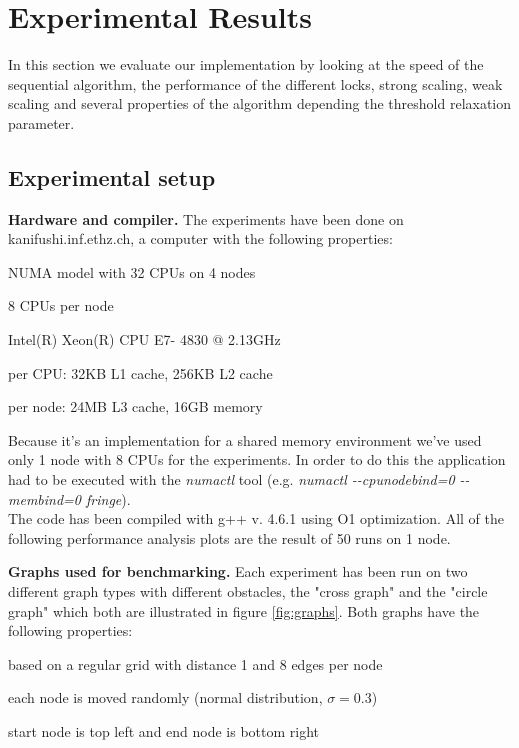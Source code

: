 \documentclass[letterpaper]{article}
\newcommand{\mypar}[1]{{\bf #1.}}
\begin{document}
\section{Experimental Results}\label{sec:exp}

In this section we evaluate our implementation by looking at the speed of the sequential algorithm, the performance of the different locks, strong scaling, weak scaling and several properties of the algorithm depending the threshold relaxation parameter.

\subsection{Experimental setup}\label{ssec:setup}

\mypar{Hardware and compiler}
The experiments have been done on kanifushi.inf.ethz.ch, a computer with the following properties:
\begin{compactitem}
\item NUMA model with 32 CPUs on 4 nodes
\item 8 CPUs per node
\item Intel(R) Xeon(R) CPU E7- 4830 @ 2.13GHz
\item per CPU: 32KB L1 cache, 256KB L2 cache
\item per node: 24MB L3 cache, 16GB memory
\end{compactitem}
Because it's an implementation for a shared memory environment we've used only 1 node with 8 CPUs for the experiments. In order to do this the application had to be executed with the \textit{numactl} tool (e.g. \textit{numactl -{}-cpunodebind=0 -{}-membind=0 fringe}).\\
The code has been compiled with g++ v. 4.6.1 using O1 optimization. All of the following performance analysis plots are the result of 50 runs on 1 node.

\mypar{Graphs used for benchmarking}
Each experiment has been run on two different graph types with different obstacles, the "cross graph" and the "circle graph" which both are illustrated in figure \ref{fig:graphs}. Both graphs have the following properties:
\begin{compactitem}
\item based on a regular grid with distance 1 and 8 edges per node
\item each node is moved randomly (normal distribution, $\sigma = 0.3$)
\item start node is top left and end node is bottom right
\end{compactitem}
\end{document}
